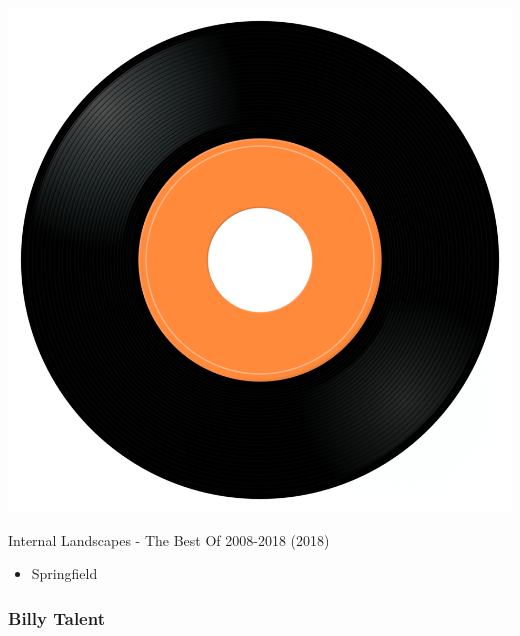 \begin{minipage}[t]{0.25\textwidth}
\captionsetup{type=figure}
\includegraphics[width=\textwidth]{Images/cover.png}
\caption*{Internal Landscapes - The Best Of 2008-2018 (2018)}
\end{minipage}
\begin{minipage}[t]{0.25\textwidth}\vspace{0pt}
\begin{itemize}[nosep,leftmargin=1em,labelwidth=*,align=left]
	\setlength{\itemsep}{0pt}
	\item Springfield
\end{itemize}
\end{minipage}

\subsubsection{Billy Talent}


